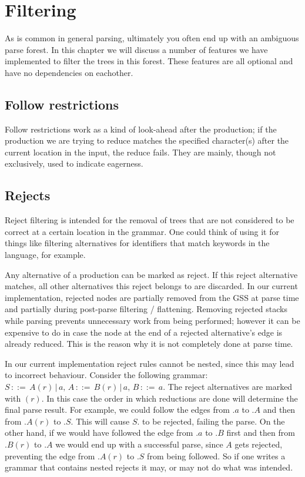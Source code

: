 \documentclass[a4paper,10pt]{article}
\begin{document}
\section{Filtering}

As is common in general parsing, ultimately you often end up with an ambiguous parse forest. In this chapter we will discuss a number of features we have implemented to filter the trees in this forest. These features are all optional and have no dependencies on eachother.

\subsection{Follow restrictions}

Follow restrictions work as a kind of look-ahead after the production; if the production we are trying to reduce matches the specified character(s) after the current location in the input, the reduce fails. They are mainly, though not exclusively, used to indicate eagerness.

\subsection{Rejects}

Reject filtering is intended for the removal of trees that are not considered to be correct at a certain location in the grammar. One could think of using it for things like filtering alternatives for identifiers that match keywords in the language, for example.

Any alternative of a production can be marked as reject. If this reject alternative matches, all other alternatives this reject belongs to are discarded. In our current implementation, rejected nodes are partially removed from the GSS at parse time and partially during post-parse filtering / flattening. Removing rejected stacks while parsing prevents unnecessary work from being performed; however it can be expensive to do in case the node at the end of a rejected alternative's edge is already reduced. This is the reason why it is not completely done at parse time.

In our current implementation reject rules cannot be nested, since this may lead to incorrect behaviour. Consider the following grammar: $S\,::=\,A(r)\,|\,a,\,A\,::=\,B(r)\,|\,a,\,B\,::=\,a$. The reject alternatives are marked with $(r)$. In this case the order in which reductions are done will determine the final parse result. For example, we could follow the edges from $.a$ to $.A$ and then from $.A(r)$ to $.S$. This will cause $S.$ to be rejected, failing the parse. On the other hand, if we would have followed the edge from $.a$ to $.B$ first and then from $.B(r)$ to $.A$ we would end up with a successful parse, since $A$ gets rejected, preventing the edge from $.A(r)$ to $.S$ from being followed. So if one writes a grammar that contains nested rejects it may, or may not do what was intended.
\end{document}
